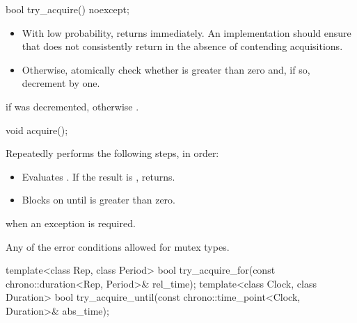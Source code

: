 %
\begin{itemdecl}
bool try_acquire() noexcept;
\end{itemdecl}

\begin{itemdescr}
\pnum
\effects
\begin{itemize}
\item
  With low probability, returns immediately.
  An implementation should ensure
  that  does not consistently return 
  in the absence of contending acquisitions.
\item
  Otherwise, atomically check whether  is greater than zero and,
  if so, decrement  by one.
\end{itemize}

\pnum
\returns
{} if  was decremented, otherwise .
\end{itemdescr}

%
\begin{itemdecl}
void acquire();
\end{itemdecl}

\begin{itemdescr}
\pnum
\effects
Repeatedly performs the following steps, in order:
\begin{itemize}
\item Evaluates . If the result is , returns.
\item Blocks on  until  is greater than zero.
\end{itemize}

\pnum
\throws
{} when an exception is required.

\pnum
\errors
Any of the error conditions
allowed for mutex types.
\end{itemdescr}

%
%
\begin{itemdecl}
template<class Rep, class Period>
  bool try_acquire_for(const chrono::duration<Rep, Period>& rel_time);
template<class Clock, class Duration>
  bool try_acquire_until(const chrono::time_point<Clock, Duration>& abs_time);
\end{itemdecl}


